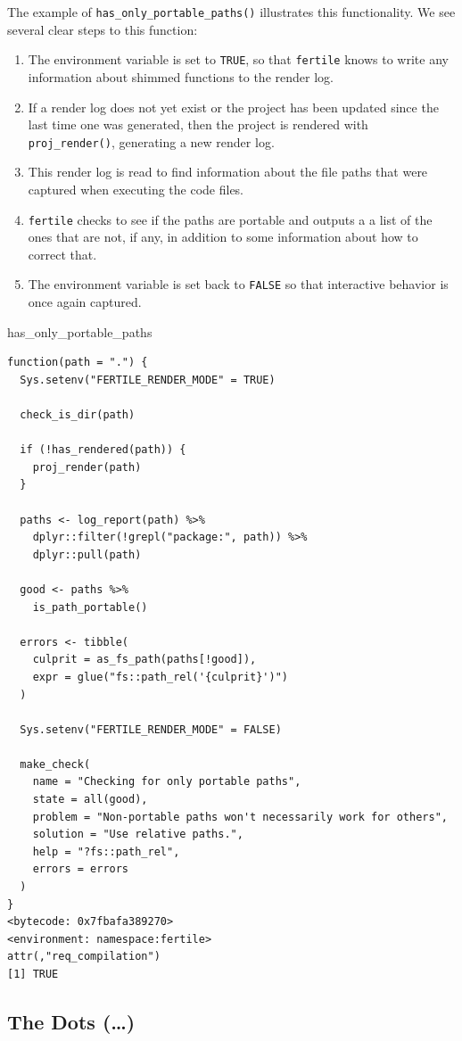 \documentclass[12pt,twoside]{reedthesis}
\newenvironment{Shaded}{\begin{snugshade}}{\end{snugshade}}
\newcommand{\NormalTok}[1]{#1}
\begin{document}
The example of \texttt{has\_only\_portable\_paths()} illustrates this functionality. We see several clear steps to this function:
\begin{enumerate}
\def\labelenumi{\arabic{enumi}.}
\item
  The environment variable is set to \texttt{TRUE}, so that \texttt{fertile} knows to write any information about shimmed functions to the render log.
\item
  If a render log does not yet exist or the project has been updated since the last time one was generated, then the project is rendered with \texttt{proj\_render()}, generating a new render log.
\item
  This render log is read to find information about the file paths that were captured when executing the code files.
\item
  \texttt{fertile} checks to see if the paths are portable and outputs a a list of the ones that are not, if any, in addition to some information about how to correct that.
\item
  The environment variable is set back to \texttt{FALSE} so that interactive behavior is once again captured.
\end{enumerate}
\begin{Shaded}
\begin{Highlighting}[]
\NormalTok{has\_only\_portable\_paths}
\end{Highlighting}
\end{Shaded}
\begin{verbatim}
function(path = ".") {
  Sys.setenv("FERTILE_RENDER_MODE" = TRUE)

  check_is_dir(path)

  if (!has_rendered(path)) {
    proj_render(path)
  }

  paths <- log_report(path) %>%
    dplyr::filter(!grepl("package:", path)) %>%
    dplyr::pull(path)

  good <- paths %>%
    is_path_portable()

  errors <- tibble(
    culprit = as_fs_path(paths[!good]),
    expr = glue("fs::path_rel('{culprit}')")
  )

  Sys.setenv("FERTILE_RENDER_MODE" = FALSE)

  make_check(
    name = "Checking for only portable paths",
    state = all(good),
    problem = "Non-portable paths won't necessarily work for others",
    solution = "Use relative paths.",
    help = "?fs::path_rel",
    errors = errors
  )
}
<bytecode: 0x7fbafa389270>
<environment: namespace:fertile>
attr(,"req_compilation")
[1] TRUE
\end{verbatim}
\hypertarget{the-dots}{%
\subsection{The Dots (\ldots)}\label{the-dots}}
\end{document}
